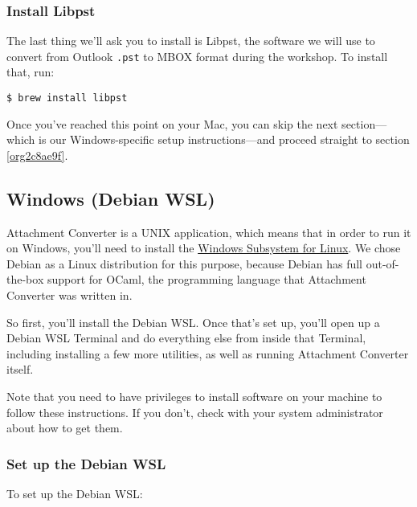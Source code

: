 \documentclass[11pt]{article}
\begin{document}
\normalsize

\subsubsection{Install Libpst}
\label{sec:org81ebd48}

The last thing we'll ask you to install is Libpst, the software we
will use to convert from Outlook \texttt{.pst} to MBOX format during the
workshop.  To install that, run:

\begin{verbatim}
$ brew install libpst
\end{verbatim}

Once you've reached this point on your Mac, you can skip the next
section---which is our Windows-specific setup instructions---and
proceed straight to section \ref{org2c8ae9f}.

\subsection{Windows (Debian WSL) \label{org2800df8}}
\label{sec:orgb5854dc}

Attachment Converter is a UNIX application, which means that in order
to run it on Windows, you'll need to install the \href{https://en.wikipedia.org/wiki/Windows\_Subsystem\_for\_Linux}{Windows Subsystem for
Linux}.  We chose Debian as a Linux distribution for this purpose,
because Debian has full out-of-the-box support for OCaml, the
programming language that Attachment Converter was written in.

So first, you'll install the Debian WSL.  Once that's set up, you'll
open up a Debian WSL Terminal and do everything else from inside that
Terminal, including installing a few more utilities, as well as
running Attachment Converter itself.

Note that you need to have privileges to install software on your
machine to follow these instructions.  If you don't, check with your
system administrator about how to get them.

\subsubsection{Set up the Debian WSL}
\label{sec:org416a306}

To set up the Debian WSL:
\end{document}
